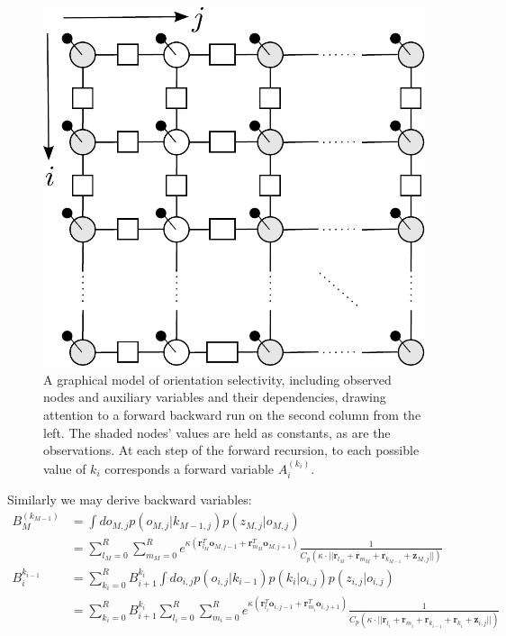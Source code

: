 \documentclass[11pt]{article}
\begin{document}
\begin{figure}[h]
\centering
\includegraphics[scale=0.55]{../fig/col_grid_gm_factors}
\caption{A graphical model of orientation selectivity, including observed nodes and auxiliary variables and their dependencies, drawing attention to a forward backward run on the second column from the left. The shaded nodes' values are held as constants, as are the observations. At each step of the forward recursion, to each possible value of $k_i$ corresponds a forward variable $A_i^{(k_i)}$.}
\label{fig:som_gm3}
\end{figure}

\noindent Similarly we may derive backward variables:
%
\begin{align*}
B_M^{(k_{M-1})} &= \int do_{M,j} p(o_{M,j}|k_{M-1,j}) p(z_{M,j}|o_{M,j}) \\
&= \sum_{l_{M}=0}^R \sum_{m_{M}=0}^R 
e^{\kappa\left( \mathbf{r}_{l_{M}}^T \mathbf{o}_{M,j-1}+
\mathbf{r}_{m_{M}}^T \mathbf{o}_{M,j+1}\right)}
\frac{1}{C_p(\kappa\cdot ||\mathbf{r}_{l_{M}}+\mathbf{r}_{m_{M}}+\mathbf{r}_{k_{M-1}}+\mathbf{z}_{M,j}||)} \\
B_i^{k_{i-1}} &= \sum_{k_i=0}^R B_{i+1}^{k_i} \int do_{i,j} p(o_{i,j}|k_{i-1}) p(k_i|o_{i,j}) p(z_{i,j}|o_{i,j}) \\
&= \sum_{k_i=0}^R B_{i+1}^{k_i}
\sum_{l_{i}=0}^R \sum_{m_{i}=0}^R 
e^{\kappa\left( \mathbf{r}_{l_{i}}^T \mathbf{o}_{i,j-1}+
\mathbf{r}_{m_{i}}^T \mathbf{o}_{i,j+1}\right)}
\frac{1}{C_p(\kappa\cdot ||\mathbf{r}_{l_{i}}+\mathbf{r}_{m_{i}}+\mathbf{r}_{k_{i-1}}+\mathbf{r}_{k_{i}}+\mathbf{z}_{i,j}||)}
\end{align*}
\end{document}
